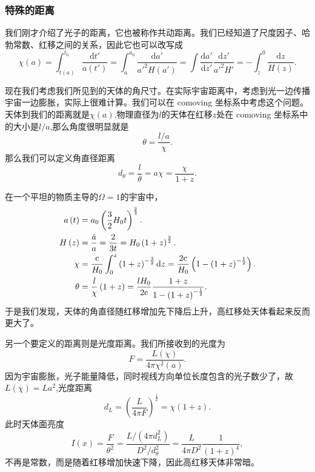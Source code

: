 \documentclass[../天体物理基础.tex]{subfiles}
\begin{document}
\subsubsection{特殊的距离}
我们刚才介绍了光子的距离，它也被称作共动距离。我们已经知道了尺度因子、哈勃常数、红移之间的关系，因此它也可以改写成
\begin{equation}
\chi\left(a\right)=\int_{t\left(a\right)}^{t_0}\frac{\mathrm{d}t'}{a\left(t'\right)}=\int_{a}^{a_{0}}\frac{\mathrm{d}a'}{a'^{2}H\left(a'\right)}=\int\frac{\mathrm{d}a'}{\mathrm{d}z'}\frac{\mathrm{d}z'}{a'^{2}H'}=-\int_{z}^{0}\frac{\mathrm{d}z}{H\left(z\right)}.
\end{equation}

现在我们考虑我们所见到的天体的角尺寸。在实际宇宙距离中，考虑到光一边传播宇宙一边膨胀，实际上很难计算。我们可以在 comoving 坐标系中考虑这个问题。天体到我们的距离就是$\chi\left(a\right)$,物理直径为$l$的天体在红移$z$处在 comoving 坐标系中的大小是$l/a$,那么角度很明显就是
\begin{equation}
\theta=\frac{l/a}{\chi}.
\end{equation}
那么我们可以定义角直径距离
\begin{equation}
d_{\theta}=\frac{l}{\theta}=a\chi=\frac{\chi}{1+z}.
\end{equation}

在一个平坦的物质主导的$\Omega=1$的宇宙中，
\begin{align}
a\left(t\right)&=a_{0}\left(\frac32H_{0}t\right)^{\frac23}.\notag\\
H\left(z\right)&=\frac{\dot a}{a}=\frac{2}{3t}=H_{0}\left(1+z\right)^{\frac32}.\notag\\
\chi&=\frac{\mathrm{c}}{H_{0}}\int_{0}^{z}\left(1+z\right)^{-\frac32}\mathrm{d}z=\frac{2\mathrm{c}}{H_{0}}\left(1-\left(1+z\right)^{-\frac12}\right).\notag\\
\theta&=\frac{l}{\chi}\left(1+z\right)=\frac{lH_{0}}{2\mathrm{c}}\frac{1+z}{1-\left(1+z\right)^{-\frac12}}.
\end{align}
于是我们发现，天体的角直径随红移增加先下降后上升，高红移处天体看起来反而更大了。

另一个要定义的距离则是光度距离。我们所接收到的光度为
\begin{equation}
F=\frac{L(\chi)}{4\pi \chi^2(a)}.
\end{equation}
因为宇宙膨胀，光子能量降低，同时视线方向单位长度包含的光子数少了，故$L\left(\chi\right)=La^{2}$,光度距离
\begin{equation}
d_{L}=\left(\frac{L}{4\pi F}\right)^{\frac12}=\chi\left(1+z\right).
\end{equation}
此时天体面亮度
\begin{equation}
I(x)=\frac{F}{\theta^{2}}=\frac{L/(4\pi d_{L}^{2})}{D^{2}/d_{\theta}^{2}}=\frac{L}{4\pi D^{2}}\frac{1}{\left(1+z\right)^{4}},
\end{equation}
不再是常数，而是随着红移增加快速下降，因此高红移天体非常暗。
\end{document}
